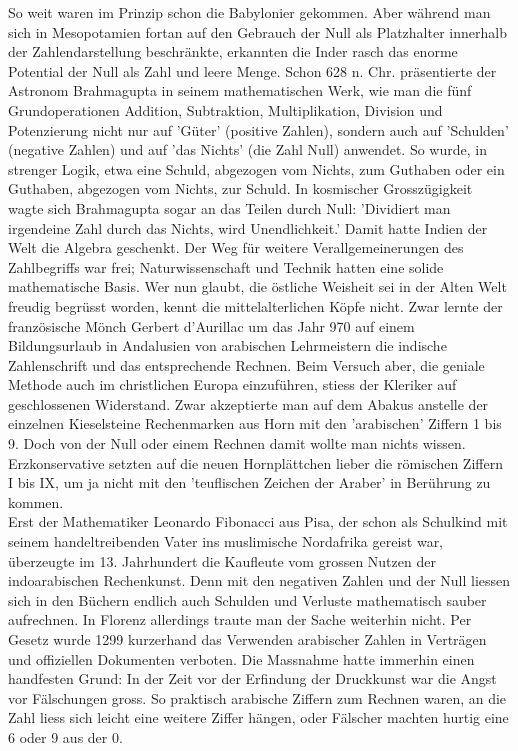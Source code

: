 \documentclass[%
11pt,%
twoside,%
titlepage,%
german,%
headsepline%
]{scrartcl}
\begin{document}
\begin{multicols}{2}
So weit waren im Prinzip schon die Babylonier gekommen. Aber während man sich in Mesopotamien fortan auf den Gebrauch der Null als Platzhalter innerhalb der Zahlendarstellung beschränkte, erkannten die Inder rasch das enorme Potential der Null als Zahl und leere Menge. Schon 628 n. Chr. präsentierte der Astronom Brahmagupta in seinem mathematischen Werk, wie man die fünf Grundoperationen Addition, Subtraktion, Multiplikation, Division und Potenzierung nicht nur auf 'Güter' (positive Zahlen), sondern auch auf 'Schulden' (negative Zahlen) und auf 'das Nichts' (die Zahl Null) anwendet. So wurde, in strenger Logik, etwa eine Schuld, abgezogen vom Nichts, zum Guthaben oder ein Guthaben, abgezogen vom Nichts, zur Schuld. In kosmischer Grosszügigkeit wagte sich Brahmagupta sogar an das Teilen durch Null: 'Dividiert man irgendeine Zahl durch das Nichts, wird Unendlichkeit.' Damit hatte Indien der Welt die Algebra geschenkt. Der Weg für weitere Verallgemeinerungen des Zahlbegriffs war frei; Naturwissenschaft und Technik hatten eine solide mathematische Basis. Wer nun glaubt, die östliche Weisheit sei in der Alten Welt freudig begrüsst worden, kennt die mittelalterlichen Köpfe nicht. Zwar lernte der französische Mönch Gerbert d’Aurillac um das Jahr 970 auf einem Bildungsurlaub in Andalusien von arabischen Lehrmeistern die indische Zahlenschrift und das entsprechende Rechnen. Beim Versuch aber, die geniale Methode auch im christlichen Europa einzuführen, stiess der Kleriker auf geschlossenen Widerstand. Zwar akzeptierte man auf dem Abakus anstelle der einzelnen Kieselsteine Rechenmarken aus Horn mit den 'arabischen' Ziffern 1 bis 9. Doch von der Null oder einem Rechnen damit wollte man nichts wissen. Erzkonservative setzten auf die neuen Hornplättchen lieber die römischen Ziffern I bis IX, um ja nicht mit den 'teuflischen Zeichen der Araber' in Berührung zu kommen.
\\
Erst der Mathematiker Leonardo Fibonacci aus Pisa, der schon als Schulkind mit seinem handeltreibenden Vater ins muslimische Nordafrika gereist war, überzeugte im 13. Jahrhundert die Kaufleute vom grossen Nutzen der indoarabischen Rechenkunst. Denn mit den negativen Zahlen und der Null liessen sich in den Büchern endlich auch Schulden und Verluste mathematisch sauber aufrechnen. In Florenz allerdings traute man der Sache weiterhin nicht. Per Gesetz wurde 1299 kurzerhand das Verwenden arabischer Zahlen in Verträgen und offiziellen Dokumenten verboten. Die Massnahme hatte immerhin einen handfesten Grund: In der Zeit vor der Erfindung der Druckkunst war die Angst vor Fälschungen gross. So praktisch arabische Ziffern zum Rechnen waren, an die Zahl liess sich leicht eine weitere Ziffer hängen, oder Fälscher machten hurtig eine 6 oder 9 aus der 0.

\end{multicols}
\end{document}
